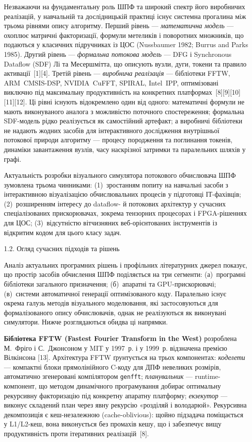 Незважаючи на фундаментальну роль ШПФ та широкий спектр його виробничих
реалізацій, у навчальній та дослідницькій практиці існує системна
прогалина між трьома рівнями опису алгоритму. Перший рівень ---
\emph{математична модель} --- охоплює матричні факторизації, формули
метеликів і поворотних множників, що подаються у класичних підручниках із
ЦОС (Nussbaumer 1982; Burrus and Parks 1985). Другий рівень ---
\emph{формальна потокова модель} --- DFG і Synchronous Dataflow (SDF) Лі
та Месершмітта, що описують вузли, дуги, токени та правило
активації~{[}1{]}{[}4{]}. Третій рівень --- \emph{виробнича реалізація}
--- бібліотеки FFTW, ARM~CMSIS-DSP, NVIDIA~CuFFT, SPIRAL, Intel~IPP,
оптимізовані виключно під максимальну продуктивність на конкретних
платформах~{[}8{]}{[}9{]}{[}10{]}{[}11{]}{[}12{]}. Ці рівні існують
відокремлено один від одного: математичні формули не мають виконуваного
аналога з можливістю поточного спостереження; формальна SDF-модель рідко
реалізується як самостійний артефакт; а виробничі бібліотеки не надають
жодних засобів для інтерактивного дослідження внутрішньої потокової
природи алгоритму --- процесу породження та поглинання токенів, динаміки
завантаження вузлів, часу наскрізної затримки та паралельних шляхів у
графі.

Актуальність розробки візуального симулятора потокового обчислювача ШПФ
зумовлена трьома чинниками: (1)~зростанням попиту на навчальні засоби з
інтерактивною візуалізацією обчислювальних процесів у підготовці
ІТ-фахівців; (2)~розширенням інтересу до dataflow- й потокових
архітектур у сучасних спеціалізованих прискорювачах, зокрема тензорних
процесорах і FPGA-рішеннях для ЦОС; (3)~відсутністю вітчизняних
веб-орієнтованих інструментів із відкритим кодом для цього класу задач.

\protect{}\label{_Toc229682906}{}1.2. Огляд сучасних підходів та рішень

Аналіз актуальних програмних рішень і профільних літературних джерел
показує, що простір засобів обчислення ШПФ поділяється на три сегменти:
(а)~програмні бібліотеки загального призначення; (б)~апаратні та
GPU-прискорювачі; (в)~системи автоматичної генерації оптимізованого
коду. Паралельно існує окрема галузь методів візуального моделювання,
які застосовуються для формалізованого опису обчислювачів, однак не
реалізуються як виконувані симулятори. Нижче розглядаються обидва ці
напрямки.

\textbf{Бібліотека FFTW (Fastest Fourier Transform in the West)}
розроблена М.~Фріго і С.~Джонсоном у MIT у 1997~р. і у 1999~р.
відзначена премією Вілкінсона {[}13{]}. Архітектура FFTW ґрунтується на
трьох компонентах: \emph{коделети} --- компактні блоки прямолінійного
C-коду для ДПФ невеликих розмірів, автоматично згенеровані компілятором
\texttt{genfft}; \emph{планувальник} --- runtime-компонент, що методом
динамічного програмування добирає оптимальну рекурсивну факторизацію під
конкретну апаратну платформу; \emph{екзекутор} --- виконує складений
план через явну рекурсію «розділяй і володарюй». Рекурсивна декомпозиція
є кеш-незалежною (cache-oblivious): щойно підзадача поміщається у
L1/L2-кеш, вона виконується без промахів кешу, що і забезпечує вищу
продуктивність проти ітеративних реалізацій~{[}8{]}.

